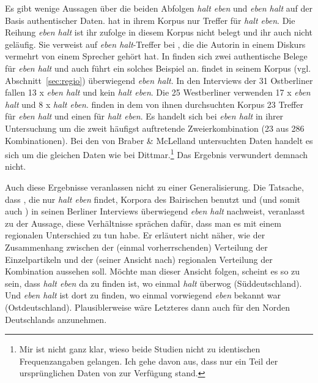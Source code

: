 Es gibt wenige Aussagen über die beiden Abfolgen \textit{halt eben} und \textit{eben halt} auf der Basis authentischer Daten. \citet[257, Fn 32]{Thurmair1989} hat in ihrem Korpus nur Treffer für \textit{halt eben}. Die Reihung \textit{eben halt} ist ihr zufolge in diesem Korpus nicht belegt und ihr auch nicht geläufig. Sie verweist auf \textit{eben halt}-Treffer bei \citet[256]{Hentschel1986}, die die Autorin in einem Diskurs vermehrt von einem Sprecher gehört hat. In \citet[78]{Hartog1982} finden sich zwei authenti\-sche Belege für \textit{eben halt} und auch \citet[310]{Rost-Roth1998} führt ein solches Beispiel an. \citet[221]{Dittmar2000} findet in seinem Korpus (vgl. Abschnitt~\ref{sec:regio}) überwiegend \textit{eben halt}. In den Interviews der 31 Ostberliner fallen 13 x \textit{eben halt} und kein \textit{halt eben}. Die 25 Westberliner verwenden 17 x \textit{eben halt} und 8 x \textit{halt eben}. \citet[468]{Braber2010} finden in dem von ihnen durchsuchten Korpus 23 Tref\-fer für \textit{eben halt} und einen für \textit{halt eben}. Es handelt sich bei \textit{eben halt} in ihrer Untersuchung um die zweit häufigst auftretende Zweierkombination (23 aus 286 Kombinationen). Bei den von Braber \& McLelland untersuchten Daten handelt es sich um die gleichen Daten wie bei Dittmar.\footnote{ Mir ist nicht ganz klar, wieso beide Studien nicht zu identischen Frequenzangaben gelangen. Ich gehe davon aus, dass \citet{Braber2010} nur ein Teil der ursprünglichen Daten von \citet{Dittmar2000} zur Verfügung stand.} Das Ergebnis verwundert demnach nicht. 

Auch diese Ergebnisse veranlassen nicht zu einer Generalisierung. Die Tatsache, dass \citet{Thurmair1989}, die nur \textit{halt eben} findet, Korpora des Bairischen benutzt und \citet[224]{Dittmar2000} (und somit auch \citealt{Braber2010}) in seinen Berliner Interviews überwiegend \textit{eben halt} nachweist, veranlasst \citet[17, Fn 41]{Elspass2005} zu der Aussage, diese Verhältnisse sprächen dafür, dass man es mit einem regionalen Unterschied zu tun habe. Er erläutert nicht näher, wie der Zusammenhang zwischen der (einmal vorherrschenden) Verteilung der Einzelpartikeln und der (seiner Ansicht nach) regionalen Verteilung der Kombination aussehen soll. Möchte man dieser Ansicht folgen, scheint es so zu sein, dass \textit{halt eben} da zu finden ist, wo einmal \textit{halt} überwog (Süddeutschland). Und \textit{eben halt} ist dort zu finden, wo einmal vorwiegend \textit{eben} bekannt war (Ostdeutschland). Plausiblerweise wäre Letzteres dann auch für den Norden Deutschlands anzunehmen.

